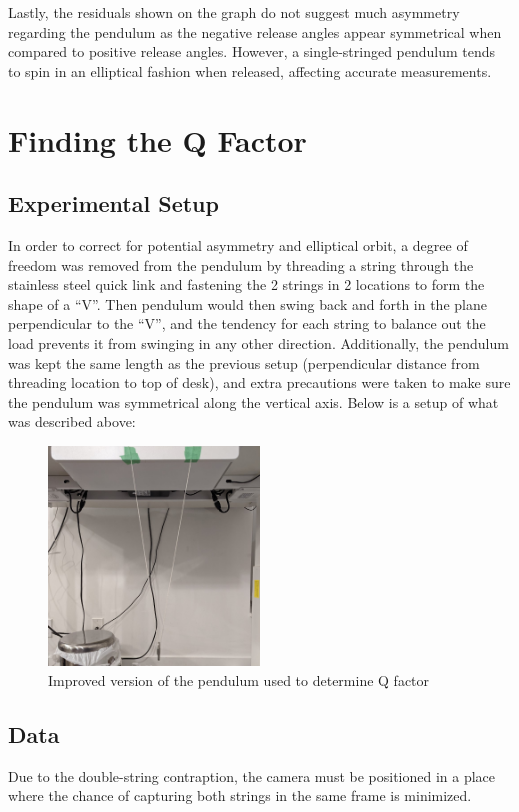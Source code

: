 \documentclass[12pt]{article}
\begin{document}
Lastly, the residuals shown on the graph do not suggest much asymmetry regarding the pendulum as the negative release angles appear symmetrical when compared to positive release angles. However, a single-stringed pendulum tends to spin in an elliptical fashion when released, affecting accurate measurements.

\section{Finding the Q Factor}

\subsection{Experimental Setup}
In order to correct for potential asymmetry and elliptical orbit, a degree of freedom was removed from the pendulum by threading a string through the stainless steel quick link and fastening the 2 strings in 2 locations to form the shape of a ``V''. Then pendulum would then swing back and forth in the plane perpendicular to the ``V'', and the tendency for each string to balance out the load prevents it from swinging in any other direction. Additionally, the pendulum was kept the same length as the previous setup (perpendicular distance from threading location to top of desk), and extra precautions were taken to make sure the pendulum was symmetrical along the vertical axis. Below is a setup of what was described above:
\begin{figure}[!hptb]
    \centering
    \includegraphics[width=0.5\textwidth]{../figures/exp_setup2.jpg}
    \caption{\centering Improved version of the pendulum used to determine Q factor}
    \label{fig:figure 3}
\end{figure}

\newpage

\subsection{Data}
Due to the double-string contraption, the camera must be positioned in a place where the chance of capturing both strings in the same frame is minimized.
\end{document}
